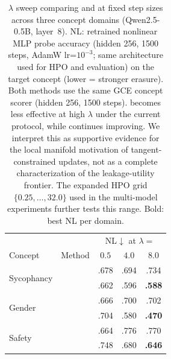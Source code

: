 \begin{table}[t]
\centering
\caption{$\lambda$ sweep comparing \AmbGCE{} and \TanGCE{} at fixed step sizes across three concept domains (Qwen2.5-0.5B, layer~8). NL: retrained nonlinear MLP probe accuracy (hidden 256, 1500 steps, AdamW lr=$10^{-3}$; same architecture used for HPO and evaluation) on the target concept (lower = stronger erasure). Both methods use the same GCE concept scorer (hidden 256, 1500 steps). \AmbGCE{} becomes less effective at high $\lambda$ under the current protocol, while \TanGCE{} continues improving. We interpret this as supportive evidence for the local manifold motivation of tangent-constrained updates, not as a complete characterization of the leakage-utility frontier. The expanded HPO grid $\{0.25,\ldots,32.0\}$ used in the multi-model experiments further tests this range. Bold: best NL per domain.}
\label{tab:lambda_sweep}
\small
\setlength{\tabcolsep}{5pt}
\begin{tabular}{ll|ccc}
\toprule
 & & \multicolumn{3}{c}{NL$\downarrow$ at $\lambda=$} \\
Concept & Method & $0.5$ & $4.0$ & $8.0$ \\
\midrule
\multirow{2}{*}{Sycophancy}
 & \AmbGCE{} & .678 & .694 & .734 \\
 & \TanGCE{}  & .662 & .596 & \textbf{.588} \\
\midrule
\multirow{2}{*}{Gender}
 & \AmbGCE{} & .666 & .700 & .702 \\
 & \TanGCE{}  & .704 & .580 & \textbf{.470} \\
\midrule
\multirow{2}{*}{Safety}
 & \AmbGCE{} & .664 & .776 & .770 \\
 & \TanGCE{}  & .748 & .680 & \textbf{.646} \\
\bottomrule
\end{tabular}
\end{table}
